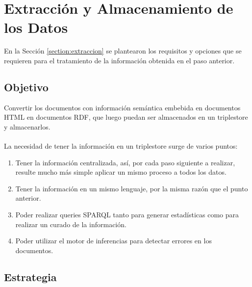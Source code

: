 \chapter{Extracción y Almacenamiento de los Datos}
\label{chapter:extraccion}

En la Sección \ref{section:extraccion} se plantearon los requisitos y opciones que se requieren
para el tratamiento de la información obtenida en el paso anterior.

\section{Objetivo}

\noindent Convertir los documentos con información semántica embebida en documentos HTML en documentos RDF, que luego puedan ser 
almacenados en un triplestore y almacenarlos.
\\\\
La necesidad de tener la información en un triplestore surge de varios puntos:
\begin{enumerate}
 \item Tener la información centralizada, así, por cada paso siguiente a realizar, resulte mucho más simple aplicar un mismo proceso a todos los datos.
 \item Tener la información en un mismo lenguaje, por la misma razón que el punto anterior.
 \item Poder realizar queries SPARQL tanto para generar estadísticas como para realizar un curado de la información.
 \item Poder utilizar el motor de inferencias para detectar errores en los documentos.
\end{enumerate}

\section{Estrategia}

